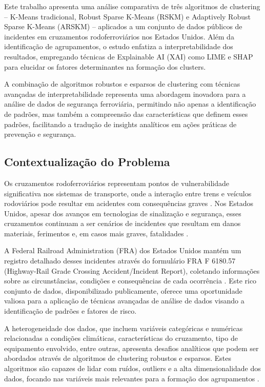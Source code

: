 \documentclass[conference]{IEEEtran}
\begin{document}
Este trabalho apresenta uma análise comparativa de três algoritmos de clustering – K-Means tradicional, Robust Sparse K-Means (RSKM) e Adaptively Robust Sparse K-Means (ARSKM) – aplicados a um conjunto de dados públicos de incidentes em cruzamentos rodoferroviários nos Estados Unidos. Além da identificação de agrupamentos, o estudo enfatiza a interpretabilidade dos resultados, empregando técnicas de Explainable AI (XAI) como LIME \cite{ribeiro2016should} e SHAP \cite{lundberg2017unified} para elucidar os fatores determinantes na formação dos clusters.

A combinação de algoritmos robustos e esparsos de clustering com técnicas avançadas de interpretabilidade representa uma abordagem inovadora para a análise de dados de segurança ferroviária, permitindo não apenas a identificação de padrões, mas também a compreensão das características que definem esses padrões, facilitando a tradução de insights analíticos em ações práticas de prevenção e segurança.

\subsection{Contextualização do Problema}
Os cruzamentos rodoferroviários representam pontos de vulnerabilidade significativa nos sistemas de transporte, onde a interação entre trens e veículos rodoviários pode resultar em acidentes com consequências graves \cite{liang2018analysis}. Nos Estados Unidos, apesar dos avanços em tecnologias de sinalização e segurança, esses cruzamentos continuam a ser cenários de incidentes que resultam em danos materiais, ferimentos e, em casos mais graves, fatalidades \cite{yan2010analysis}.

A Federal Railroad Administration (FRA) dos Estados Unidos mantém um registro detalhado desses incidentes através do formulário FRA F 6180.57 (Highway-Rail Grade Crossing Accident/Incident Report), coletando informações sobre as circunstâncias, condições e consequências de cada ocorrência \cite{fra2021data}. Este rico conjunto de dados, disponibilizado publicamente, oferece uma oportunidade valiosa para a aplicação de técnicas avançadas de análise de dados visando a identificação de padrões e fatores de risco.

A heterogeneidade dos dados, que incluem variáveis categóricas e numéricas relacionadas a condições climáticas, características do cruzamento, tipo de equipamento envolvido, entre outras, apresenta desafios analíticos que podem ser abordados através de algoritmos de clustering robustos e esparsos. Estes algoritmos são capazes de lidar com ruídos, outliers e a alta dimensionalidade dos dados, focando nas variáveis mais relevantes para a formação dos agrupamentos \cite{witten2010framework}.
\end{document}
